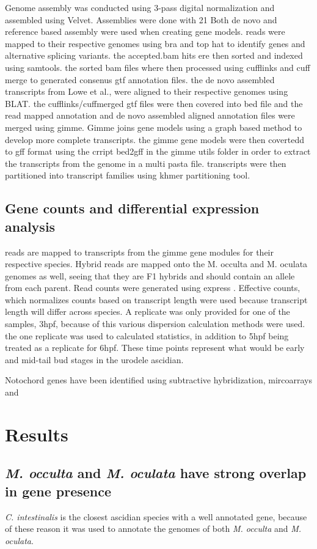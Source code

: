 Genome assembly was conducted using 3-pass digital normalization\cite{} and assembled using Velvet\cite{}. Assemblies were done with 21 
Both de novo and reference based assembly were used when creating gene models. 
reads were mapped to their respective genomes using bra and top hat to identify genes and alternative splicing variants. the accepted.bam hits ere then sorted and indexed using samtools. the sorted bam files where then processed using cufflinks and cuff merge to generated consenus gtf annotation files. the de novo assembled transcripts from Lowe et al., were aligned to their respective genomes using BLAT. the cufflinks/cuffmerged gtf files were then covered into bed file and the read mapped annotation and de novo assembled aligned annotation files were merged using gimme. Gimme joins gene models using a graph based method to develop more complete transcripts. the gimme gene models were then covertedd to gff format using the crript bed2gff in the gimme utils folder in order to extract the transcripts from the genome in a multi pasta file. transcripts were then partitioned into transcript families using khmer partitioning tool. 

\subsection{Gene counts and differential expression analysis}
reads are mapped to transcripts from the gimme gene modules for their respective species. Hybrid reads are mapped onto the M. occulta and M. oculata genomes as well, seeing that they are F1 hybrids and should contain an allele from each parent. Read counts were generated using express \cite{}. Effective counts, which normalizes counts based on transcript length were used because transcript length will differ across species. A replicate was only provided for one of the samples, 3hpf, because of this various dispersion calculation methods were used. the one replicate was used to calculated statistics, in addition to 5hpf being treated as a replicate for 6hpf. These time points represent what would be early and mid-tail bud stages in the urodele ascidian. 

Notochord genes have been identified using subtractive hybridization, mircoarrays and 

\section{Results}
\subsection{\textit{M. occulta} and \textit{M. oculata} have strong overlap in gene presence}
\textit{C. intestinalis} is the closest ascidian species with a well annotated gene, because of these reason it was used to annotate the genomes of both \textit{M. occulta} and \textit{M. oculata}. 

